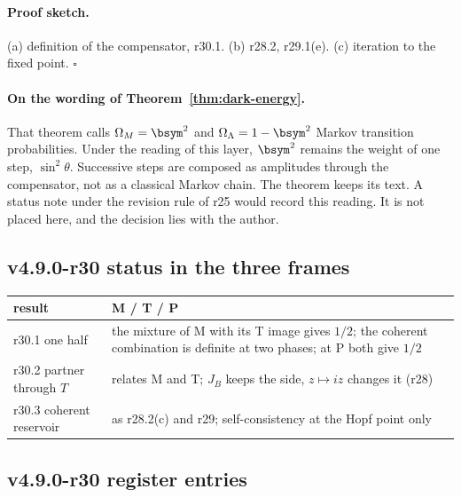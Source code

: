 \paragraph{Proof sketch.}
(a) definition of the compensator, r30.1.  (b) r28.2, r29.1(e).  (c) iteration to the fixed point.  \(\square\)

\paragraph{On the wording of Theorem~\ref{thm:dark-energy}.}
That theorem calls \(\Omega_M=\bsym^2\) and \(\Omega_\Lambda=1-\bsym^2\) Markov transition probabilities.  Under the reading of this layer,
\(\bsym^2\) remains the weight of one step, \(\sin^2\theta\).  Successive steps are composed as amplitudes through the compensator, not as a
classical Markov chain.  The theorem keeps its text.  A status note under the revision rule of r25 would record this reading.  It is
not placed here, and the decision lies with the author.

\subsection*{v4.9.0-r30 status in the three frames}
\label{subsec:v490-r30-frames}

\begin{center}
\small
\begin{tabular}{@{}>{\raggedright\arraybackslash}p{}>{\raggedright\arraybackslash}p{}@{}}
\toprule
result & M / T / P\\
\midrule
r30.1 one half & the mixture of M with its T image gives \(1/2\); the coherent combination is definite at two phases; at P both give \(1/2\)\\
r30.2 partner through \(T\) & relates M and T; \(J_B\) keeps the side, \(z\mapsto iz\) changes it (r28)\\
r30.3 coherent reservoir & as r28.2(c) and r29; self-consistency at the Hopf point only\\
\bottomrule
\end{tabular}
\end{center}

\subsection*{v4.9.0-r30 register entries}
\label{subsec:v490-r30-register}

